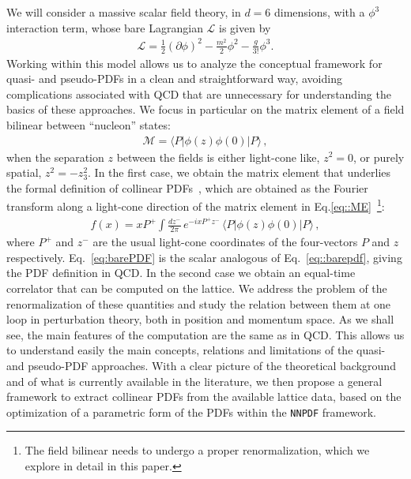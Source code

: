 We will consider a massive scalar field theory, in $d=6$ dimensions, with a
$\phi^3$ interaction term, whose bare Lagrangian $\mathcal{L}$ is given by
\begin{align}
    \label{eq:Lagrangian}
    \mathcal{L} = \frac{1}{2}\left(\partial\phi\right)^2 
    - \frac{m^2}{2} \phi^2 - \frac{g}{3!} \phi^3.
\end{align}
Working within this model allows us to analyze the conceptual framework for
quasi- and pseudo-PDFs in a clean and straightforward way, avoiding
complications associated with QCD that are unnecessary for understanding the
basics of these approaches. We focus in particular on the matrix element of a
field bilinear between ``nucleon'' states: 
\begin{align}
    \label{eq::ME}
    \mathcal{M} = 
    \langle P | \phi\left(z\right) \phi\left(0\right) | P \rangle\, ,
\end{align}
when the separation $z$ between the fields is either light-cone like, $z^2=0$,
or purely spatial, $z^2=-z_3^2$. In the first case, we obtain the matrix element
that underlies the formal definition of collinear PDFs~\cite{Collins:1980ui,
Collins:1981uw}, which are obtained as the Fourier transform along a light-cone
direction of the matrix element in Eq.\eqref{eq::ME}~\footnote{The field
bilinear needs to undergo a proper renormalization, which we explore in detail in
this paper. }:
\begin{align}
    \label{eq:barePDF}
    f(x) = xP^+ \int \frac{dz^-}{2\pi}\, e^{-i xP^+ z^-}\,
    \langle P | \phi\left(z\right) \phi\left(0\right) | P \rangle\, ,
\end{align}
where $P^+$ and $z^-$ are the usual light-cone coordinates of the four-vectors
$P$ and $z$ respectively.
Eq.~\eqref{eq:barePDF} is the scalar analogous of Eq.~\eqref{eq::barepdf}, giving the PDF definition in QCD.
In the second case we obtain an equal-time correlator
that can be computed on the lattice. We address the problem of the
renormalization of these quantities and study the relation between them at one
loop in perturbation theory, both in position and momentum space. As we shall
see, the main features of the computation are the same as in QCD. This allows us
to understand easily the main concepts, relations and limitations of the quasi-
and pseudo-PDF approaches. With a clear picture of the theoretical background
and of what is currently available in the literature, we then propose a general
framework to extract collinear PDFs from the available lattice data, based on
the optimization of a parametric form of the PDFs within the {\tt NNPDF} framework.

